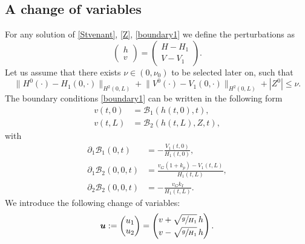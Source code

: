 \documentclass[11pt]{article}
\numberwithin{equation}{section}
\let\mathcal\mathscr
\theoremstyle{definition}
\begin{document}
\subsection{A change of variables}
For any solution of \eqref{Stvenant}, \eqref{Z}, \eqref{boundary1}
we define the perturbations as
\begin{equation}
\begin{pmatrix}
h\\v
\end{pmatrix}=
\begin{pmatrix}
H-H_{1}\\
V-V_{1}
\end{pmatrix}.
\label{change1}
\end{equation}
Let us assume that there exists $\nu\in(0,\nu_{0})$ to be selected later on, such that
\begin{equation*}
\lVert H^{0}(\cdot)-H_{1}(0,\cdot)\rVert_{H^{2}(0,L)}+\lVert V^{0}(\cdot)-V_{1}(0,\cdot)\rVert_{H^{2}(0,L)}+|Z^{0}|\leq \nu.
\end{equation*}
The boundary conditions \eqref{boundary1} can be written in the following form
\begin{equation}
\begin{split}
v(t,0)&=\mathcal{B}_{1}(h(t,0),t),\\
v(t,L)&=\mathcal{B}_{2}(h(t,L),Z,t),
\end{split}
\label{bound1}
\end{equation}
with
\begin{equation}
\begin{split}
\partial_{1}\mathcal{B}_{1}(0,t)&=-\frac{V_{1}(t,0)}{H_{1}(t,0)},\\
\partial_{1}\mathcal{B}_{2}(0,0,t)&=\frac{v_{G}(1+k_{p})-V_{1}(t,L)}{H_{1}(t,L)},\\
\partial_{2}\mathcal{B}_{2}(0,0,t)&=-\frac{v_{G}k_{I}}{H_{1}(t,L)}.
\end{split}
\label{k1k30}
\end{equation}
We introduce the following change of variables:
\begin{equation}
\boldsymbol{u}: =\begin{pmatrix}
u_{1}\\u_{2}
\end{pmatrix}=
\begin{pmatrix}
v+\sqrt{\sfrac{g}{H_{1}}}\,h\\[2pt]
v-\sqrt{\sfrac{g}{H_{1}}}\,h
\end{pmatrix}.
\label{change2}
\end{equation}
\end{document}
